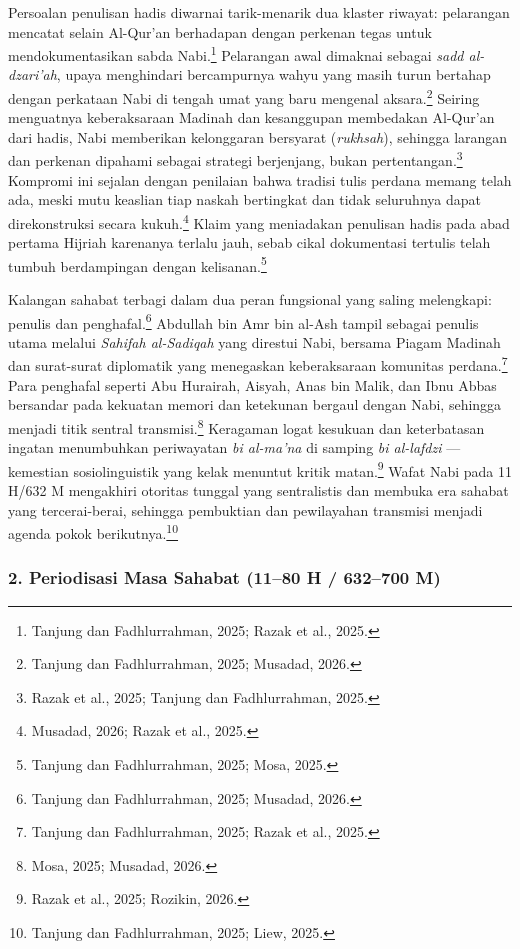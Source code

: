 Persoalan penulisan hadis diwarnai tarik-menarik dua klaster riwayat: pelarangan mencatat selain Al-Qur'an berhadapan dengan perkenan tegas untuk mendokumentasikan sabda Nabi.\footnote{Tanjung dan Fadhlurrahman, 2025; Razak et al., 2025.} Pelarangan awal dimaknai sebagai \textit{sadd al-dzari'ah}, upaya menghindari bercampurnya wahyu yang masih turun bertahap dengan perkataan Nabi di tengah umat yang baru mengenal aksara.\footnote{Tanjung dan Fadhlurrahman, 2025; Musadad, 2026.} Seiring menguatnya keberaksaraan Madinah dan kesanggupan membedakan Al-Qur'an dari hadis, Nabi memberikan kelonggaran bersyarat (\textit{rukhsah}), sehingga larangan dan perkenan dipahami sebagai strategi berjenjang, bukan pertentangan.\footnote{Razak et al., 2025; Tanjung dan Fadhlurrahman, 2025.} Kompromi ini sejalan dengan penilaian bahwa tradisi tulis perdana memang telah ada, meski mutu keaslian tiap naskah bertingkat dan tidak seluruhnya dapat direkonstruksi secara kukuh.\footnote{Musadad, 2026; Razak et al., 2025.} Klaim yang meniadakan penulisan hadis pada abad pertama Hijriah karenanya terlalu jauh, sebab cikal dokumentasi tertulis telah tumbuh berdampingan dengan kelisanan.\footnote{Tanjung dan Fadhlurrahman, 2025; Mosa, 2025.}

Kalangan sahabat terbagi dalam dua peran fungsional yang saling melengkapi: penulis dan penghafal.\footnote{Tanjung dan Fadhlurrahman, 2025; Musadad, 2026.} Abdullah bin Amr bin al-Ash tampil sebagai penulis utama melalui \textit{Sahifah al-Sadiqah} yang direstui Nabi, bersama Piagam Madinah dan surat-surat diplomatik yang menegaskan keberaksaraan komunitas perdana.\footnote{Tanjung dan Fadhlurrahman, 2025; Razak et al., 2025.} Para penghafal seperti Abu Hurairah, Aisyah, Anas bin Malik, dan Ibnu Abbas bersandar pada kekuatan memori dan ketekunan bergaul dengan Nabi, sehingga menjadi titik sentral transmisi.\footnote{Mosa, 2025; Musadad, 2026.} Keragaman logat kesukuan dan keterbatasan ingatan menumbuhkan periwayatan \textit{bi al-ma'na} di samping \textit{bi al-lafdzi} --- kemestian sosiolinguistik yang kelak menuntut kritik matan.\footnote{Razak et al., 2025; Rozikin, 2026.} Wafat Nabi pada 11 H/632 M mengakhiri otoritas tunggal yang sentralistis dan membuka era sahabat yang tercerai-berai, sehingga pembuktian dan pewilayahan transmisi menjadi agenda pokok berikutnya.\footnote{Tanjung dan Fadhlurrahman, 2025; Liew, 2025.}

\subsubsection*{2. Periodisasi Masa Sahabat (11--80 H / 632--700 M)}

